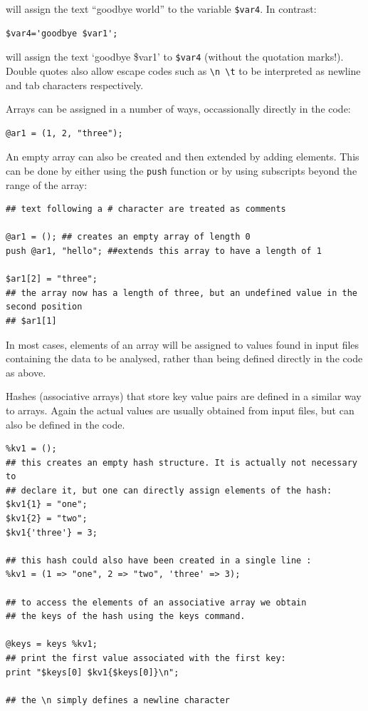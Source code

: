 \documentclass[11pt]{article}
\begin{document}
will assign the text ``goodbye world'' to the variable \texttt{\$var4}.
In contrast:


\begin{verbatim}
$var4='goodbye $var1';
\end{verbatim}

will assign the text `goodbye \$var1' to \texttt{\$var4} (without the quotation
marks!).
Double quotes also allow escape codes such as \texttt{\textbackslash{}n \textbackslash{}t} to be interpreted
as newline and tab characters respectively.

Arrays can be assigned in a number of ways, occassionally directly in
the code:


\begin{verbatim}
@ar1 = (1, 2, "three");
\end{verbatim}

An empty array can also be created and then extended by adding elements.
This can be done by either using the \texttt{push} function or by using
subscripts beyond the range of the array:


\begin{verbatim}
## text following a # character are treated as comments

@ar1 = (); ## creates an empty array of length 0 
push @ar1, "hello"; ##extends this array to have a length of 1

$ar1[2] = "three"; 
## the array now has a length of three, but an undefined value in the second position 
## $ar1[1]
\end{verbatim}

In most cases, elements of an array will be assigned to values found in
input files containing the data to be analysed, rather than being
defined directly in the code as above.

Hashes (associative arrays) that store key value pairs are defined in a
similar way to arrays. Again the actual values are usually obtained from
input files, but can also be defined in the code.


\begin{verbatim}
%kv1 = ();
## this creates an empty hash structure. It is actually not necessary to
## declare it, but one can directly assign elements of the hash:
$kv1{1} = "one";
$kv1{2} = "two";
$kv1{'three'} = 3;

## this hash could also have been created in a single line :
%kv1 = (1 => "one", 2 => "two", 'three' => 3);

## to access the elements of an associative array we obtain
## the keys of the hash using the keys command.

@keys = keys %kv1;
## print the first value associated with the first key:
print "$keys[0] $kv1{$keys[0]}\n";

## the \n simply defines a newline character
\end{verbatim}
\end{document}
